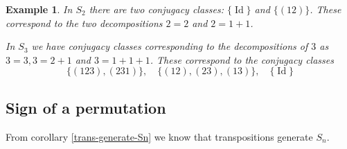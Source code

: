 \documentclass[12pt]{article}
\numberwithin{equation}{subsection}
\theoremstyle{note}
\newtheorem{example}[subsection]{Example}
\newcommand{\Id}{\operatorname{Id}}
\begin{document}
\begin{example}
	In $S_2$ there are two conjugacy classes: $\{\Id\}$ and $\{(12)\}$. These correspond to the two decompositions $2=2$ and $2=1+1$.
	
	In $S_3$ we have conjugacy classes corresponding to the decompositions of $3$ as $3=3, 3=2+1$ and $3=1+1+1$. These correspond to the conjugacy classes \[ \{ (123), (231) \}, \quad \{ (12), (23), (13)\}, \quad \{ \Id\}\]
	
\end{example}



\subsection{Sign of a permutation}

From corollary \ref{trans-generate-Sn} we know that transpositions generate $S_n$. 
\end{document}
